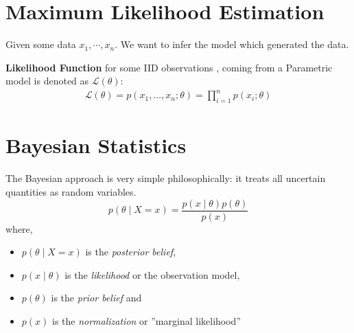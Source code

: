 \documentclass[a4paper,portrait,columns=2, hidelinks]{cheatsheet}
\begin{document}
\section{Maximum Likelihood Estimation}
Given some data $x_1, \cdots, x_n$. We want to infer the model which generated the data.

\textbf{Likelihood Function} for some IID observations , coming from a Parametric model is denoted as $\mathcal{L}(\theta)$:
\begin{align*}
\mathcal{L}(\theta) = p(x_{1},\ldots,x_{n};\theta) = \prod_{i=1}^{n}p(x_{i};\theta)
\end{align*}

\section{Bayesian Statistics}

The Bayesian approach is very simple philosophically: it treats all uncertain quantities as random variables.
$$ p(\theta \mid X = x) = \frac{p(x \mid \theta) p(\theta)}{p(x)} $$
where,
\begin{itemize}
	\item[] $ p(\theta \mid X = x) $ is the \emph{posterior belief}, 
	\item[] $ p(x \mid \theta) $ is the \emph{likelihood} or the observation model, 
	\item[] $ p(\theta) $ is the \emph{prior belief} and 
	\item[] $ p(x) $ is the \emph{normalization} or ''marginal likelihood''
\end{itemize}

\end{document}
